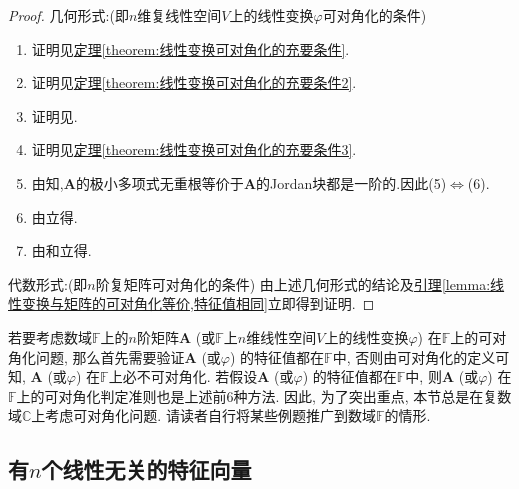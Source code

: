 \documentclass[../../main.tex]{subfiles}%
\begin{document}
\begin{proof}

{\heiti 几何形式:}(即\(n\)维复线性空间\(V\)上的线性变换\(\varphi\)可对角化的条件)
\begin{enumerate}[(1)]
\item 证明见\hyperref[theorem:线性变换可对角化的充要条件]{定理\ref{theorem:线性变换可对角化的充要条件}}.

\item 证明见\hyperref[theorem:线性变换可对角化的充要条件2]{定理\ref{theorem:线性变换可对角化的充要条件2}}.

\item 证明见.

\item 证明见\hyperref[theorem:线性变换可对角化的充要条件3]{定理\ref{theorem:线性变换可对角化的充要条件3}}.

\item 由知,$\boldsymbol{A}$的极小多项式无重根等价于$\boldsymbol{A}$的Jordan块都是一阶的.因此(5)$\iff$(6).

\item 由立得.

\item 由和立得.
\end{enumerate}
{\heiti 代数形式:}(即\(n\)阶复矩阵可对角化的条件)
由上述几何形式的结论及\hyperref[lemma:线性变换与矩阵的可对角化等价,特征值相同]{引理\ref{lemma:线性变换与矩阵的可对角化等价,特征值相同}}立即得到证明.
\end{proof}
\begin{remark}
若要考虑数域\(\mathbb{F}\)上的\(n\)阶矩阵\(\boldsymbol{A}\) (或\(\mathbb{F}\)上\(n\)维线性空间\(V\)上的线性变换\(\varphi\)) 在\(\mathbb{F}\)上的可对角化问题, 那么首先需要验证\(\boldsymbol{A}\) (或\(\varphi\)) 的特征值都在\(\mathbb{F}\)中, 否则由可对角化的定义可知, \(\boldsymbol{A}\) (或\(\varphi\)) 在\(\mathbb{F}\)上必不可对角化. 若假设\(\boldsymbol{A}\) (或\(\varphi\)) 的特征值都在\(\mathbb{F}\)中, 则\(\boldsymbol{A}\) (或\(\varphi\)) 在\(\mathbb{F}\)上的可对角化判定准则也是上述前\(6\)种方法. 因此, 为了突出重点, 本节总是在复数域\(\mathbb{C}\)上考虑可对角化问题. 请读者自行将某些例题推广到数域\(\mathbb{F}\)的情形. 
\end{remark}



\subsection{有$n$个线性无关的特征向量}
\end{document}
